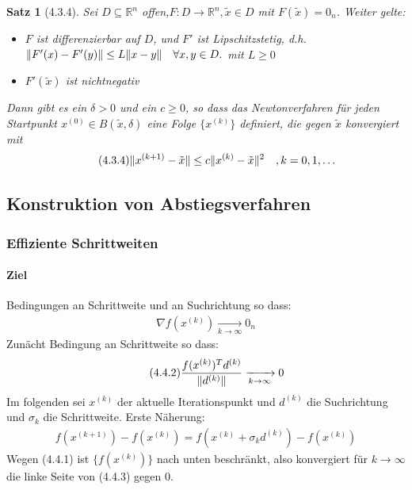 \documentclass[ngerman,halfparskip]{scrartcl}
\DeclarePairedDelimiter{\norm}{\lVert}{\rVert}
\newtheorem*{satz}{Satz}
\theoremstyle{definition}
\newcommand*{\R}{\mathbb{R}}      %
\begin{document}
\begin{satz}[4.3.4]
Sei $D\subseteq \R^n$ offen,$F\colon D\rightarrow \R^n, \tilde x\in D$ mit $F(\tilde x)=0_n$. Weiter gelte:
\begin{itemize}
\item [a)] $F$ ist differenzierbar auf $D$, und $F'$ ist Lipschitzstetig, d.h. $\norm{F'(x)-F'(y)}\leq L\norm{x-y} \quad \forall x,y\in D.$ mit $L\geq 0$
\item [b)] $F'(\tilde x)$ ist nichtnegativ
\end{itemize}
Dann gibt es ein $\delta >0$ und ein $c\geq 0$, so dass das Newtonverfahren für jeden Startpunkt $x^{(0)}\in B(\tilde x,\delta)$ eine Folge $\{x^{(k)}\}$ definiert, die gegen $\tilde x$ konvergiert mit 
\begin{gather*}\tag{4.3.4}
\norm{x^{(k+1)}-\tilde x}\leq c \norm{x^{(k)}-\tilde x}^2 \quad , k=0,1,\ldots
\end{gather*}
\end{satz}

\subsection{Konstruktion von Abstiegsverfahren}
\subsubsection{Effiziente Schrittweiten}
\paragraph{Ziel} Bedingungen an Schrittweite und an Suchrichtung so dass:
\begin{gather*}\tag{4.4.1}
\nabla f(x^{(k)})\xrightarrow[k\rightarrow \infty]{} 0_n
\end{gather*}
Zunächt Bedingung an Schrittweite so dass:
\begin{gather*}\tag{4.4.2}
\frac{f(x^{(k)})^Td^{(k)}}{\norm{d^{(k)}}}\xrightarrow[k\rightarrow \infty]{} 0
\end{gather*}
Im folgenden sei $x^{(k)}$ der aktuelle Iterationspunkt und $d^{(k)}$ die Suchrichtung und $\sigma_k$ die Schrittweite. Erste Näherung:
\begin{gather*}\tag{4.4.3}
f(x^{(k+1)})-f(x^{(k)})=f(x^{(k)}+\sigma_kd^{(k)})-f(x^{(k)})
\end{gather*}
Wegen (4.4.1) ist $\{f(x^{(k)})\}$ nach unten beschränkt, also konvergiert für $k\rightarrow\infty$ die linke Seite von (4.4.3) gegen $0$.
\end{document}
